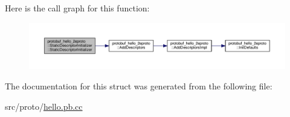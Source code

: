 Here is the call graph for this function\+:
\nopagebreak
\begin{figure}[H]
\begin{center}
\leavevmode
\includegraphics[width=350pt]{structprotobuf__hello__2eproto_1_1_static_descriptor_initializer_ab4ab71e6a39328f4e966168f656ee68b_cgraph}
\end{center}
\end{figure}




The documentation for this struct was generated from the following file\+:\begin{DoxyCompactItemize}
\item 
src/proto/\hyperlink{hello_8pb_8cc}{hello.\+pb.\+cc}\end{DoxyCompactItemize}
